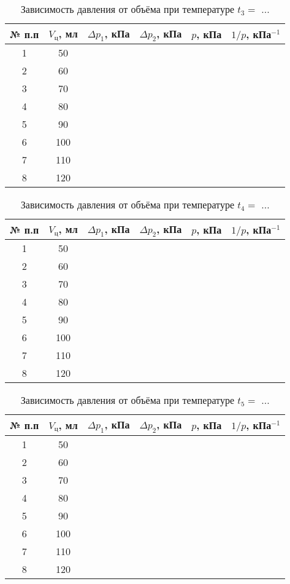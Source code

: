 \documentclass[11pt]{article}
\begin{document}
\begin{table}[H]
	\centering
	\renewcommand\thetable{1.3}
	\caption{Зависимость давления от объёма при температуре $t_3 = $ ...}
	\begin{tabular}{|c|c|c|c|c|c|}
		\hline
		№ п.п & $V_ц$, мл & $\Delta p_1$, кПа & $\Delta p_2$, кПа & $p$, кПа & $1/p$, кПа$^{-1}$\\
		\hline
		1 & 50 & & & &\\
		\hline
		2 & 60 & & & &\\
		\hline
		3 & 70 & & & &\\
		\hline
		4 & 80 & & & &\\
		\hline
		5 & 90 & & & &\\
		\hline
		6 & 100 & & & &\\
		\hline
		7 & 110 & & & &\\
		\hline
		8 & 120 & & & &\\
		\hline
	\end{tabular}
\end{table}
\begin{table}[H]
	\centering
	\renewcommand\thetable{1.4}
	\caption{Зависимость давления от объёма при температуре $t_4 = $ ...}
	\begin{tabular}{|c|c|c|c|c|c|}
		\hline
		№ п.п & $V_ц$, мл & $\Delta p_1$, кПа & $\Delta p_2$, кПа & $p$, кПа & $1/p$, кПа$^{-1}$\\
		\hline
		1 & 50 & & & &\\
		\hline
		2 & 60 & & & &\\
		\hline
		3 & 70 & & & &\\
		\hline
		4 & 80 & & & &\\
		\hline
		5 & 90 & & & &\\
		\hline
		6 & 100 & & & &\\
		\hline
		7 & 110 & & & &\\
		\hline
		8 & 120 & & & &\\
		\hline
	\end{tabular}
\end{table}
\begin{table}[H]
	\centering
	\renewcommand\thetable{1.5}
	\caption{Зависимость давления от объёма при температуре $t_5 = $ ...}
	\begin{tabular}{|c|c|c|c|c|c|}
		\hline
		№ п.п & $V_ц$, мл & $\Delta p_1$, кПа & $\Delta p_2$, кПа & $p$, кПа & $1/p$, кПа$^{-1}$\\
		\hline
		1 & 50 & & & &\\
		\hline
		2 & 60 & & & &\\
		\hline
		3 & 70 & & & &\\
		\hline
		4 & 80 & & & &\\
		\hline
		5 & 90 & & & &\\
		\hline
		6 & 100 & & & &\\
		\hline
		7 & 110 & & & &\\
		\hline
		8 & 120 & & & &\\
		\hline
	\end{tabular}
\end{table}
\end{document}
